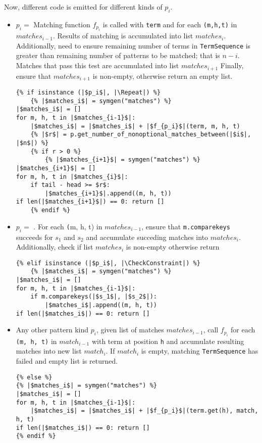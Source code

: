 Now, different code is emitted for different kinds of $p_i$. 

\begin{itemize}
\item $p_i=$ \Repeat Matching function $f_{p_i}$ is called with \texttt{term} and for each \texttt{(m,h,t)} in $matches_{i-1}$. Results of matching is accumulated into list $matches_{i}$. Additionally, need to ensure remaining number of terms in \texttt{TermSequence} is greater than remaining number of patterns to be matched; that is $n-i$. Matches that pass this test are accumulated into list $matches_{i+1}$ Finally, ensure that $matches_{i+1}$ is non-empty, otherwise return an empty list.
\begin{verbatim}
{% if isinstance (|$p_i$|, |\Repeat|) %}
	{% |$matches_i$| = symgen("matches") %}
|$matches_i$| = []
for m, h, t in |$matches_{i-1}$|:
	|$matches_i$| = |$matches_i$| + |$f_{p_i}$|(term, m, h, t)
	{% |$r$| = p.get_number_of_nonoptional_matches_between(|$i$|, |$n$|) %}
	{% if r > 0 %}
		{% |$matches_{i+1}$| = symgen("matches") %}
|$matches_{i+1}$| = []
for m, h, t in |$matches_{i}$|:
	if tail - head >= $r$:
		|$matches_{i+1}$|.append((m, h, t))
if len(|$matches_{i+1}$|) == 0: return []
	{% endif %}
\end{verbatim}

\item $p_i=$ \CheckConstraint. For each \texttt(m, h, t) in $matches_{i-1}$, ensure that \texttt{m.comparekeys} succeeds for $s_1$ and $s_2$ and accumulate succeding matches into $matches_{i}$. Additionally, check if list $matches_{i}$ is non-empty otherwise return
\begin{verbatim}
{% elif isinstance (|$p_i$|, |\CheckConstraint|) %}
	{% |$matches_i$| = symgen("matches") %}
|$matches_i$| = []
for m, h, t in |$matches_{i-1}$|:
	if m.comparekeys(|$s_1$|, |$s_2$|):
		|$matches_i$|.append((m, h, t))
if len(|$matches_i$|) == 0: return []
\end{verbatim}

\item Any other pattern kind $p_i$, given list of matches $matches_{i-1}$, call $f_{p_i}$ for each \texttt{(m, h, t)} in $match_{i-1}$ with term at position \texttt{h} and accumulate resulting matches into new list $match_{i}$. If $match_{i}$ is empty, matching \texttt{TermSequence} has failed and empty list is returned.
\begin{verbatim}
{% else %}
{% |$matches_i$| = symgen("matches") %}
|$matches_i$| = []
for m, h, t in |$matches_{i-1}$|:
	|$matches_i$| = |$matches_i$| + |$f_{p_i}$|(term.get(h), match, h, t)
if len(|$matches_i$|) == 0: return []
{% endif %}
\end{verbatim}
\end{itemize}

